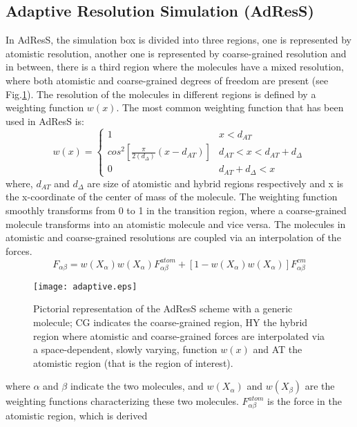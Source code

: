 \documentclass[a4paper,preprint,unsortedaddress]{revtex4-1}
\begin{document}
\subsection{Adaptive Resolution Simulation (AdResS)} \label{adress}
In AdResS, the simulation box is divided into three regions, one is represented by atomistic resolution, another one 
is represented by coarse-grained resolution and in between, there is a third region where the molecules 
have a mixed resolution, where both atomistic and coarse-grained 
degrees of freedom are present (see Fig.\ref{fig1}). The resolution of the molecules 
in different regions is defined by a weighting function $w(x)$. The most common weighting function that has been used in AdResS is:
\begin{equation*}
    w(x) = \begin{cases}
               1               & x < d_{AT} \\
               cos^{2}\left[\frac{\pi}{2(d_{\Delta})}(x-d_{AT})\right]   & d_{AT} < x < d_{AT}+d_{\Delta}\\
               0 & d_{AT} + d_{\Delta}< x
           \end{cases}
\end{equation*}
where, $d_{AT}$ and $d_{\Delta}$ are size of atomistic and hybrid regions respectively and x is the 
x-coordinate of the center of mass of the molecule.
The weighting function smoothly transforms from 0 to 1 in the transition region, where a coarse-grained molecule 
transforms into an atomistic molecule and 
vice versa. The molecules in atomistic and coarse-grained resolutions are coupled via an interpolation of the forces.
\begin{equation}
F_{\alpha \beta} = w(X_{\alpha})w(X_{\alpha})F_{\alpha\beta}^{atom} + [1 - w(X_{\alpha})w(X_{\alpha})]F_{\alpha\beta}^{cm}
\end{equation}
 \begin{figure}
   \texttt{[image: adaptive.eps]}
   \caption{{Pictorial representation of the AdResS scheme with a generic molecule; CG indicates the coarse-grained region, HY the hybrid region where atomistic and coarse-grained forces are interpolated via a space-dependent, slowly varying, function $w(x)$ and AT the atomistic region (that is the region of interest).}}
   \label{fig1}
 \end{figure}
where $\alpha$ and $\beta$ indicate the two molecules, and $w(X_{\alpha})$ and $w(X_{\beta})$ are the weighting functions
characterizing these two molecules. $F_{\alpha\beta}^{atom}$ is the force in the atomistic region, which is derived 
\end{document}
